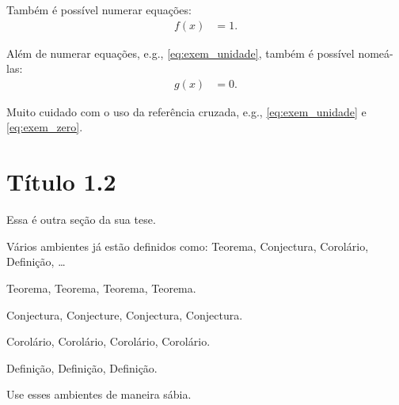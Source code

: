 Tamb\'{e}m \'{e} poss\'ivel numerar equa\c{c}\~{o}es:
\begin{align}
    f(x) &= 1.
    \label{eq:exem_unidade}
\end{align}

Al\'{e}m de numerar equa\c{c}\~{o}es, e.g., \eqref{eq:exem_unidade}, tamb\'{e}m \'{e}
poss\'ivel nome\'a-las:
\begin{align}
    g(x) &= 0.
    \tag{EIN}
    \label{eq:exem_zero}
\end{align}

Muito cuidado com o uso da refer\^{e}ncia cruzada, e.g.,
\eqref{eq:exem_unidade} e \eqref{eq:exem_zero}.

\section{T\'itulo 1.2}
Essa \'{e} outra se\c{c}\~{a}o da sua tese.

V\'arios ambientes j\'a est\~{a}o definidos como: Teorema, Conjectura, Corol\'ario,
Defini\c{c}\~{a}o, \ldots

\begin{thm}
Teorema, Teorema, Teorema, Teorema.
\end{thm}

\begin{con}
Conjectura, Conjecture, Conjectura, Conjectura.
\end{con}

\begin{cor}
Corol\'ario, Corol\'ario, Corol\'ario, Corol\'ario.
\end{cor}

\begin{dfn}
Defini\c{c}\~{a}o, Defini\c{c}\~{a}o, Defini\c{c}\~{a}o.
\end{dfn}

Use esses ambientes de maneira s\'abia.
